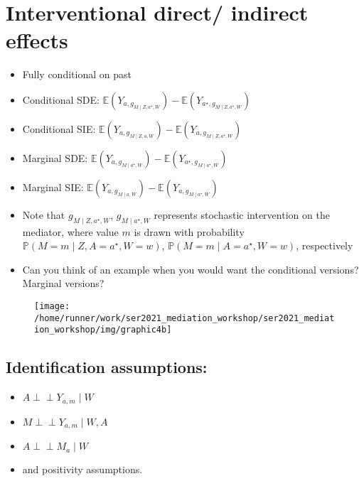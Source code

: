 \documentclass[
  12pt, krantz2,
]{book}
\providecommand{\tightlist}{%
  \setlength{\itemsep}{0pt}\setlength{\parskip}{0pt}}
\theoremstyle{definition}
\theoremstyle{definition}
\theoremstyle{definition}
\newcommand{\indep}{\mbox{$\perp\!\!\!\perp$}}
\renewcommand{\P}{\mathbb{P}}
\newcommand{\E}{\mathbb{E}}
\newcommand{\1}{\mathbbm{1}}
\begin{document}
\hypertarget{interventional-direct-indirect-effects}{%
\section*{Interventional direct/ indirect effects}\label{interventional-direct-indirect-effects}}


\begin{itemize}
\tightlist
\item
  Fully conditional on past
\item
  Conditional SDE: \(\E(Y_{a, g_{M \mid Z, a^{\star}, W}}) - \E(Y_{a^{\star}, g_{M \mid Z, a^{\star}, W}})\)
\item
  Conditional SIE: \(\E(Y_{a, g_{M \mid Z, a, W}}) - \E(Y_{a, g_{M \mid Z, a^{\star}, W}})\)
\item
  Marginal SDE: \(\E(Y_{a, g_{M \mid a^{\star}, W}}) - \E(Y_{a^{\star}, g_{M \mid a^{\star}, W}})\)
\item
  Marginal SIE: \(\E(Y_{a, g_{M \mid a, W}}) - \E(Y_{a, g_{M \mid a^{\star}, W}})\)
\item
  Note that \(g_{M \mid Z, a^{\star}, W}\), \(g_{M \mid a^{\star}, W}\) represents
  stochastic intervention on the mediator, where value \(m\) is drawn with
  probability \(\P(M = m \mid Z, A = a^{\star}, W = w)\),
  \(\P(M = m \mid A = a^{\star}, W = w)\), respectively
\item
  Can you think of an example when you would want the conditional versions?
  Marginal versions?
\end{itemize}

\begin{figure}

{\centering \texttt{[image: /home/runner/work/ser2021\_mediation\_workshop/ser2021\_mediation\_workshop/img/graphic4b]} 

}

\end{figure}

\hypertarget{identification-assumptions-1}{%
\subsection{Identification assumptions:}\label{identification-assumptions-1}}

\begin{itemize}
\tightlist
\item
  \(A \indep Y_{a,m} \mid W\)
\item
  \(M \indep Y_{a,m} \mid W, A\)
\item
  \(A \indep M_a \mid W\)
\item
  and positivity assumptions.
\end{itemize}
\end{document}
